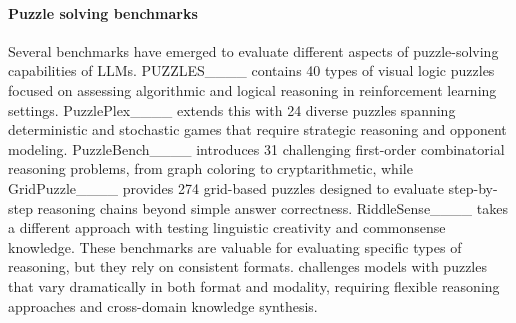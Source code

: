 \paragraph{Puzzle solving benchmarks}
Several benchmarks have emerged to evaluate different aspects of puzzle-solving capabilities of LLMs. 
PUZZLES____ contains 40 types of visual logic puzzles focused on assessing algorithmic and logical reasoning in reinforcement learning settings.
PuzzlePlex____ extends this with 24 diverse puzzles spanning deterministic and stochastic games that require strategic reasoning and opponent modeling.
PuzzleBench____ introduces 31 challenging first-order combinatorial reasoning problems, from graph coloring to cryptarithmetic, while GridPuzzle____ provides 274 grid-based puzzles designed to evaluate step-by-step reasoning chains beyond simple answer correctness. 
RiddleSense____ takes a different approach with 
testing linguistic creativity and commonsense knowledge. 
These benchmarks are valuable for evaluating specific types of reasoning, but they rely on consistent formats.
\enigmaeval challenges models with puzzles that vary dramatically in both format and modality, requiring flexible reasoning approaches and cross-domain knowledge synthesis.





